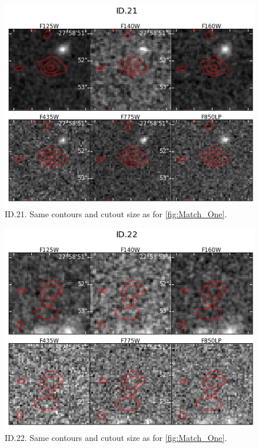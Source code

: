 \begin{figure}[tbp]
\centering \includegraphics[width=160mm]{Matched/ASPECS_Cutout_20.jpg}
\caption{ID.21. Same contours and cutout size as for \ref{fig:Match_One}.}
\label{fig:Match_Three}
\end{figure}

\begin{figure}[tbp]
\centering \includegraphics[width=160mm]{Matched/ASPECS_Cutout_21.jpg}
\caption{ID.22. Same contours and cutout size as for \ref{fig:Match_One}.}
\label{fig:Match_Three}
\end{figure}

